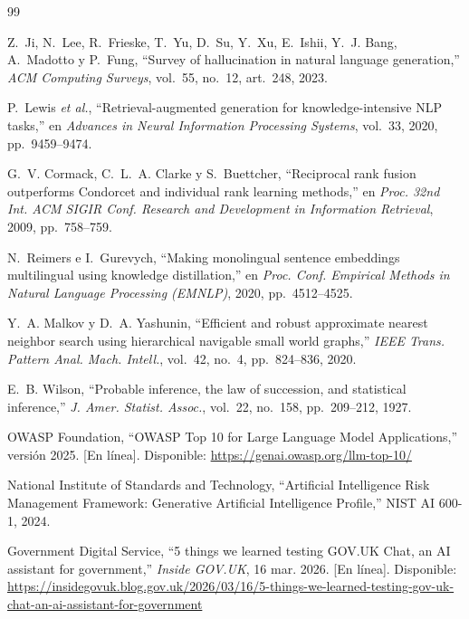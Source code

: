 \documentclass[conference]{IEEEtran}
\begin{document}
\def\UrlBreaks{\do\/\do-\do.\do_\do=\do?}
\begin{thebibliography}{99}
\sloppy

Z.~Ji, N.~Lee, R.~Frieske, T.~Yu, D.~Su, Y.~Xu, E.~Ishii, Y.~J. Bang, A.~Madotto y P.~Fung, ``Survey of hallucination in natural language generation,'' \textit{ACM Computing Surveys}, vol.~55, no.~12, art.~248, 2023.

P.~Lewis \textit{et al.}, ``Retrieval-augmented generation for knowledge-intensive NLP tasks,'' en \textit{Advances in Neural Information Processing Systems}, vol.~33, 2020, pp.~9459--9474.

G.~V. Cormack, C.~L.~A. Clarke y S.~Buettcher, ``Reciprocal rank fusion outperforms Condorcet and individual rank learning methods,'' en \textit{Proc. 32nd Int. ACM SIGIR Conf. Research and Development in Information Retrieval}, 2009, pp.~758--759.

N.~Reimers e I.~Gurevych, ``Making monolingual sentence embeddings multilingual using knowledge distillation,'' en \textit{Proc. Conf. Empirical Methods in Natural Language Processing (EMNLP)}, 2020, pp.~4512--4525.

Y.~A. Malkov y D.~A. Yashunin, ``Efficient and robust approximate nearest neighbor search using hierarchical navigable small world graphs,'' \textit{IEEE Trans. Pattern Anal. Mach. Intell.}, vol.~42, no.~4, pp.~824--836, 2020.

E.~B. Wilson, ``Probable inference, the law of succession, and statistical inference,'' \textit{J. Amer. Statist. Assoc.}, vol.~22, no.~158, pp.~209--212, 1927.

OWASP Foundation, ``OWASP Top 10 for Large Language Model Applications,'' versión 2025. [En línea]. Disponible: \url{https://genai.owasp.org/llm-top-10/}

National Institute of Standards and Technology, ``Artificial Intelligence Risk Management Framework: Generative Artificial Intelligence Profile,'' NIST AI 600-1, 2024.

Government Digital Service, ``5 things we learned testing GOV.UK Chat, an AI assistant for government,'' \textit{Inside GOV.UK}, 16 mar. 2026. [En línea]. Disponible: \url{https://insidegovuk.blog.gov.uk/2026/03/16/5-things-we-learned-testing-gov-uk-chat-an-ai-assistant-for-government}


\end{thebibliography}
\end{document}
